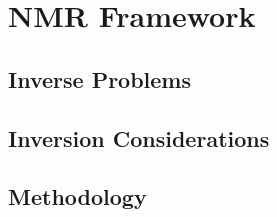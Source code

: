 
\chapter{NMR Framework}
\label{ch:NMR}

\section{Inverse Problems}
\label{sec:inverse}

\section{Inversion Considerations}
\label{sec:prob}

\section{Methodology}
\label{sec:method}
